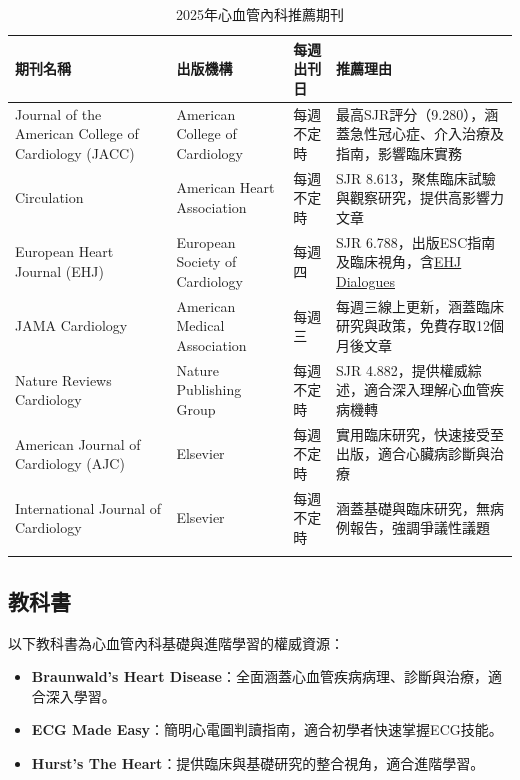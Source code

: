 \documentclass[12pt,a4paper]{article}
\begin{document}
\begin{longtable}{|p{4cm}|p{4cm}|p{2cm}|p{5cm}|}
\hline
\textbf{期刊名稱} & \textbf{出版機構} & \textbf{每週出刊日} & \textbf{推薦理由} \\
\hline
\endhead
Journal of the American College of Cardiology (JACC) & American College of Cardiology & 每週不定時 & 最高SJR評分（9.280），涵蓋急性冠心症、介入治療及指南，影響臨床實務 \\
Circulation & American Heart Association & 每週不定時 & SJR 8.613，聚焦臨床試驗與觀察研究，提供高影響力文章 \\
European Heart Journal (EHJ) & European Society of Cardiology & 每週四 & SJR 6.788，出版ESC指南及臨床視角，含\href{https://academic.oup.com/eurheartj}{EHJ Dialogues} \\
JAMA Cardiology & American Medical Association & 每週三 & 每週三線上更新，涵蓋臨床研究與政策，免費存取12個月後文章 \\
Nature Reviews Cardiology & Nature Publishing Group & 每週不定時 & SJR 4.882，提供權威綜述，適合深入理解心血管疾病機轉 \\
American Journal of Cardiology (AJC) & Elsevier & 每週不定時 & 實用臨床研究，快速接受至出版，適合心臟病診斷與治療 \\
International Journal of Cardiology & Elsevier & 每週不定時 & 涵蓋基礎與臨床研究，無病例報告，強調爭議性議題 \\
\bottomrule
\caption{2025年心血管內科推薦期刊}
\end{longtable}

\vspace{0.5cm}

\subsection{教科書}
以下教科書為心血管內科基礎與進階學習的權威資源：
\begin{itemize}[nosep]
    \item \textbf{Braunwald’s Heart Disease}：全面涵蓋心血管疾病病理、診斷與治療，適合深入學習。
    \item \textbf{ECG Made Easy}：簡明心電圖判讀指南，適合初學者快速掌握ECG技能。
    \item \textbf{Hurst’s The Heart}：提供臨床與基礎研究的整合視角，適合進階學習。
\end{itemize}
\end{document}
